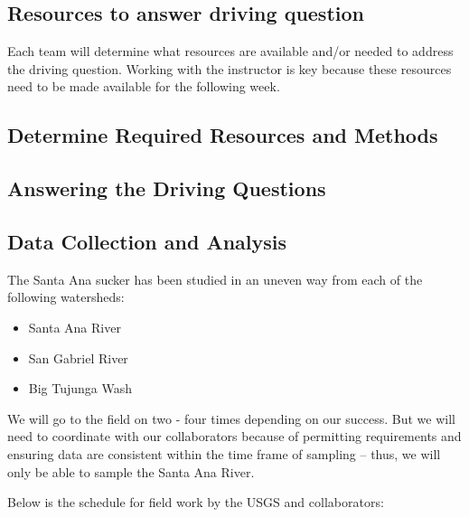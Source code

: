 \documentclass{tufte-handout}\usepackage[]{graphicx}\usepackage[]{color}
\begin{document}
\subsection{Resources to answer driving question}

Each team will determine what resources are available and/or needed to address the driving question. Working with the instructor is key because these resources need to be made available for the following week.

\subsection{Determine Required Resources and Methods}


\subsection{Answering the Driving Questions}






\subsection{Data Collection and Analysis}

The Santa Ana sucker has been studied in an uneven way from each of the following watersheds: 

\begin{itemize}
  \item Santa Ana River
  \item San Gabriel River
  \item Big Tujunga Wash
\end{itemize}

We will go to the field on two - four times depending on our success. But we will need to coordinate with our collaborators because of permitting requirements and ensuring data are consistent within the time frame of sampling -- thus, we will only be able to sample the Santa Ana River.

Below is the schedule for field work by the USGS and collaborators:
\end{document}

